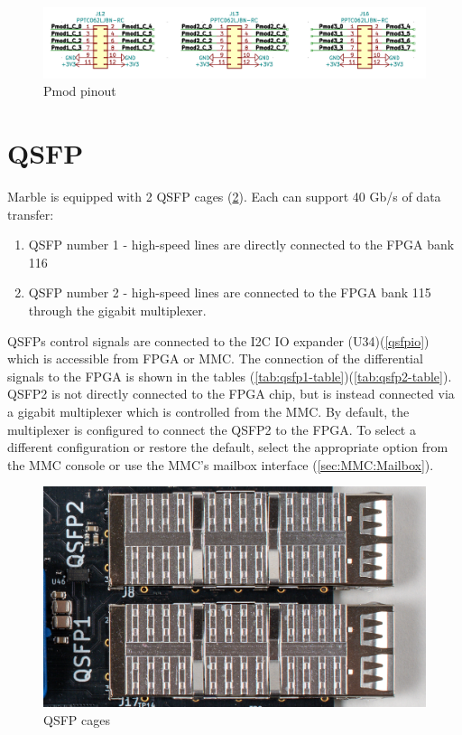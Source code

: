 \documentclass[12pt,oneside,a4]{article}
\begin{document}
\begin{figure}[H]
\begin{center}
\includegraphics[width=1\linewidth]{pmods.png}
 \caption{Pmod pinout}\label{pmods}
\end{center}
\end{figure}

\section{QSFP}
Marble is equipped with 2 QSFP cages (\ref{qsfp}). Each can support 40 Gb/s of data transfer:
\begin{enumerate}
	\item QSFP number 1 - high-speed lines are directly connected to the FPGA bank 116
	\item QSFP number 2 - high-speed lines are connected to the FPGA bank 115 through the gigabit multiplexer.
\end{enumerate}

QSFPs control signals are connected to the I2C IO expander (U34)(\ref{qsfpio}) which is accessible from FPGA or MMC.
The connection of the differential signals to the FPGA is shown in the tables (\ref{tab:qsfp1-table})(\ref{tab:qsfp2-table}).
QSFP2 is not directly connected to the FPGA chip, but is instead connected via a gigabit multiplexer which is controlled from the MMC.
By default, the multiplexer is configured to connect the QSFP2 to the FPGA.
To select a different configuration or restore the default, select the appropriate option from the MMC console or use the MMC's mailbox interface (\ref{sec:MMC:Mailbox}).

\begin{figure}[H]
\begin{center}
\includegraphics[width=0.8\linewidth]{qsfp.png}
 \caption{QSFP cages}\label{qsfp}
\end{center}
\end{figure}
\end{document}
